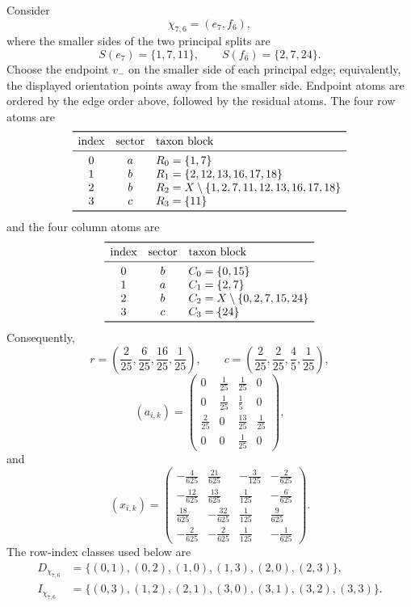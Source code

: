 Consider
\[
 \chi_{7,6}=(e_7,f_6),
\]
where the smaller sides of the two principal splits are
\[
 S(e_7)=\{1,7,11\},
 \qquad
 S(f_6)=\{2,7,24\}.
\]
Choose the endpoint $v_-$ on the smaller side of each principal edge;
equivalently, the displayed orientation points away from the smaller side.
Endpoint atoms are ordered
by the edge order above, followed by the residual atoms.  The four row atoms
are
\[
\begin{array}{ccl}
\toprule
\text{index}&\text{sector}&\text{taxon block}\\
\midrule
0&a&R_0=\{1,7\}\\
1&b&R_1=\{2,12,13,16,17,18\}\\
2&b&R_2=X\setminus\{1,2,7,11,12,13,16,17,18\}\\
3&c&R_3=\{11\}\\
\bottomrule
\end{array}
\]
and the four column atoms are
\[
\begin{array}{ccl}
\toprule
\text{index}&\text{sector}&\text{taxon block}\\
\midrule
0&b&C_0=\{0,15\}\\
1&a&C_1=\{2,7\}\\
2&b&C_2=X\setminus\{0,2,7,15,24\}\\
3&c&C_3=\{24\}\\
\bottomrule
\end{array}
\]
Consequently,
\[
 r=\left(\frac2{25},\frac6{25},\frac{16}{25},\frac1{25}\right),
 \qquad
 c=\left(\frac2{25},\frac2{25},\frac45,\frac1{25}\right),
\]
\[
 (a_{i,k})=
 \begin{pmatrix}
 0&\frac1{25}&\frac1{25}&0\\
 0&\frac1{25}&\frac15&0\\
 \frac2{25}&0&\frac{13}{25}&\frac1{25}\\
 0&0&\frac1{25}&0
 \end{pmatrix},
\]
and
\[
 (x_{i,k})=
 \begin{pmatrix}
 -\frac4{625}&\frac{21}{625}&-\frac3{125}&-\frac2{625}\\
 -\frac{12}{625}&\frac{13}{625}&\frac1{125}&-\frac6{625}\\
 \frac{18}{625}&-\frac{32}{625}&\frac1{125}&\frac9{625}\\
 -\frac2{625}&-\frac2{625}&\frac1{125}&-\frac1{625}
 \end{pmatrix}.
\]
The row-index classes used below are
\[
\begin{aligned}
D_{\chi_{7,6}}
&=\{(0,1),(0,2),(1,0),(1,3),(2,0),(2,3)\},\\
I_{\chi_{7,6}}
&=\{(0,3),(1,2),(2,1),(3,0),(3,1),(3,2),(3,3)\}.
\end{aligned}
\]

